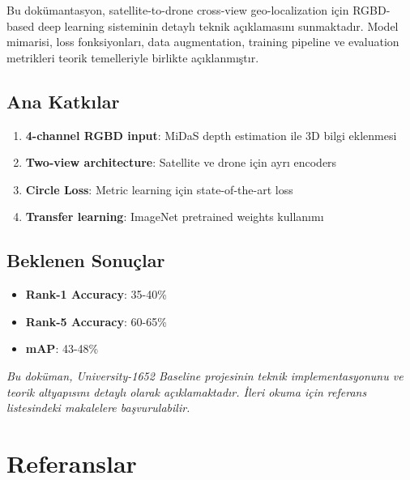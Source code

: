 \documentclass[12pt,a4paper]{article}
\begin{document}
Bu dokümantasyon, satellite-to-drone cross-view geo-localization için RGBD-based deep learning sisteminin detaylı teknik açıklamasını sunmaktadır. Model mimarisi, loss fonksiyonları, data augmentation, training pipeline ve evaluation metrikleri teorik temelleriyle birlikte açıklanmıştır.

\subsection{Ana Katkılar}
\begin{enumerate}
    \item \textbf{4-channel RGBD input}: MiDaS depth estimation ile 3D bilgi eklenmesi
    \item \textbf{Two-view architecture}: Satellite ve drone için ayrı encoders
    \item \textbf{Circle Loss}: Metric learning için state-of-the-art loss
    \item \textbf{Transfer learning}: ImageNet pretrained weights kullanımı
\end{enumerate}

\subsection{Beklenen Sonuçlar}
\begin{itemize}
    \item \textbf{Rank-1 Accuracy}: 35-40\%
    \item \textbf{Rank-5 Accuracy}: 60-65\%
    \item \textbf{mAP}: 43-48\%
\end{itemize}

\vspace{1cm}
\noindent
\textit{Bu doküman, University-1652 Baseline projesinin teknik implementasyonunu ve teorik altyapısını detaylı olarak açıklamaktadır. İleri okuma için referans listesindeki makalelere başvurulabilir.}

\section*{Referanslar}
\end{document}
